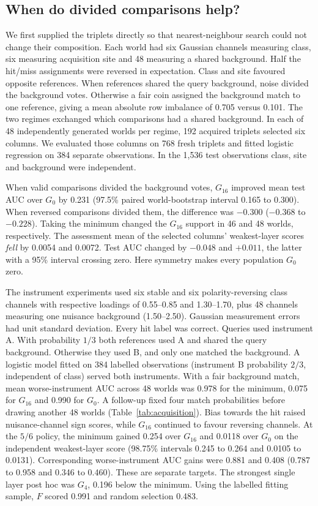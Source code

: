\subsection{When do divided comparisons help?}\label{sec:mechanism}
We first supplied the triplets directly so that nearest-neighbour search could not change their composition. Each world had six Gaussian channels measuring class, six measuring acquisition site and 48 measuring a shared background. Half the hit/miss assignments were reversed in expectation. Class and site favoured opposite references. When references shared the query background, noise divided the background votes. Otherwise a fair coin assigned the background match to one reference, giving a mean absolute row imbalance of 0.705 versus 0.101. The two regimes exchanged which comparisons had a shared background. In each of 48 independently generated worlds per regime, 192 acquired triplets selected six columns. We evaluated those columns on 768 fresh triplets and fitted logistic regression on 384 separate observations. In the 1,536 test observations class, site and background were independent.

When valid comparisons divided the background votes, $G_{16}$ improved mean test AUC over $G_0$ by 0.231 (97.5\% paired world-bootstrap interval 0.165 to 0.300). When reversed comparisons divided them, the difference was $-0.300$ ($-0.368$ to $-0.228$). Taking the minimum changed the $G_{16}$ support in 46 and 48 worlds, respectively. The assessment mean of the selected columns' weakest-layer scores \emph{fell} by 0.0054 and 0.0072. Test AUC changed by $-0.048$ and $+0.011$, the latter with a 95\% interval crossing zero. Here symmetry makes every population $G_0$ zero.

The instrument experiments used six stable and six polarity-reversing class channels with respective loadings of 0.55--0.85 and 1.30--1.70, plus 48 channels measuring one nuisance background (1.50--2.50). Gaussian measurement errors had unit standard deviation. Every hit label was correct. Queries used instrument A. With probability $1/3$ both references used A and shared the query background. Otherwise they used B, and only one matched the background. A logistic model fitted on 384 labelled observations (instrument B probability $2/3$, independent of class) served both instruments. With a fair background match, mean worse-instrument AUC across 48 worlds was 0.978 for the minimum, 0.075 for $G_{16}$ and 0.990 for $G_0$. A follow-up fixed four match probabilities before drawing another 48 worlds (Table~\ref{tab:acquisition}). Bias towards the hit raised nuisance-channel sign scores, while $G_{16}$ continued to favour reversing channels. At the $5/6$ policy, the minimum gained 0.254 over $G_{16}$ and 0.0118 over $G_0$ on the independent weakest-layer score (98.75\% intervals 0.245 to 0.264 and 0.0105 to 0.0131). Corresponding worse-instrument AUC gains were 0.881 and 0.408 (0.787 to 0.958 and 0.346 to 0.460). These are separate targets. The strongest single layer post hoc was $G_4$, 0.196 below the minimum. Using the labelled fitting sample, $F$ scored 0.991 and random selection 0.483.


